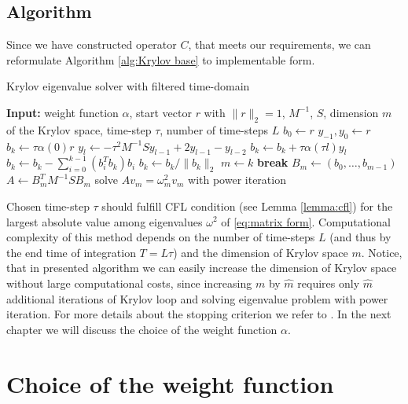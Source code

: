 \documentclass[a4paper,11pt,bibliography=totoc,listof=totoc,headinclude=true,cleardoublepage=empty,oneside]{scrbook}
\begin{document}
\section{Algorithm}
Since we have constructed operator $C$, that meets our requirements, we can reformulate Algorithm \ref{alg:Krylov base} to implementable form.
\begin{algorithm}[H]
\caption{Krylov eigenvalue solver with filtered time-domain}\label{alg:Krylov pro}
   \begin{algorithmic}
        \State \textbf{Input: } weight function $\alpha$, start vector $r$ with $\|r\|_2 = 1$, $M^{-1}$, $S$, dimension $m$ of the Krylov space, time-step $\tau$, number of time-steps $L$
        \State $b_0 \gets r$
            \State $y_{-1}, y_{0} \gets r$
            \State $b_k \gets \tau \alpha(0) r$
                \State $y_l \gets -\tau^2 M^{-1}S y_{l-1} + 2y_{l-1} - y_{l-2}$ 
                \State $b_k \gets b_k + \tau \alpha(\tau l)y_l$ 
            \EndFor
            \State $b_k \gets b_k - \sum_{i=0}^{k-1}(b_i^Tb_k)b_i$ 
                \State $b_k\gets b_k/\|b_k\|_2$ 
            \Else
                \State $m\gets k$   
                \State \textbf{break} 
            \EndIf
        \EndFor
        \State $B_m \gets (b_0, \dots, b_{m-1})$ 
        \State $A \gets B_m^T M^{-1}S B_m$
        \State solve $Av_m = \omega_m^2 v_m$ with power iteration
    \end{algorithmic} 
\end{algorithm}
Chosen time-step $\tau$ should fulfill CFL condition (see Lemma \ref{lemma:cfl}) for the largest absolute value among eigenvalues $\omega^2$ of \eqref{eq:matrix form}. Computational complexity of this method depends on the number of time-steps $L$ (and thus by the end time of integration $T = L\tau$) and the dimension of Krylov space $m$. Notice, that in presented algorithm we can easily increase the dimension of Krylov space without large computational costs, since increasing $m$ by $\hat{m}$ requires only $\hat{m}$ additional iterations of Krylov loop and solving eigenvalue problem with power iteration. For more details about the stopping criterion we refer to \cite[p. 8--9]{nannen}. In the next chapter we will discuss the choice of the weight function $\alpha$.



\chapter{Choice of the weight function}
\label{chapter:function}
\cite{nannen}\cite{numodes}

 
%

\end{document}
